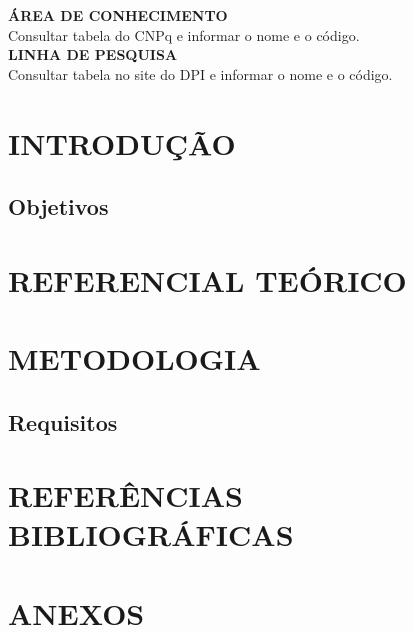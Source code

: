 \documentclass[12pt,a4paper]{article}
\begin{document}
		\noindent \textbf{ÁREA DE CONHECIMENTO}\\
		\indent Consultar tabela do CNPq e informar o nome e o código.\\
		
		\noindent \textbf{LINHA DE PESQUISA}\\
		\indent Consultar tabela no site do DPI e informar o nome e o código.\\
		
	\newpage
		\section{INTRODUÇÃO}
		\subsection{Objetivos}
		
	\newpage
		\section{REFERENCIAL TEÓRICO}
	
	\newpage
		\section{METODOLOGIA}
		\subsection{Requisitos}
	
	\newpage
		\section{REFERÊNCIAS BIBLIOGRÁFICAS}
		
	\newpage
		\section{ANEXOS}
		
	\newpage
\end{document}
